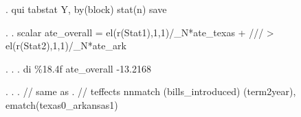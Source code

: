 . qui tabstat Y, by(block) stat(n) save   

. 
. scalar ate_overall = el(r(Stat1),1,1)/_N*ate_texas + /// 
>                                          el(r(Stat2),1,1)/_N*ate_ark

. 
. 
. di \%18.4f ate_overall
          -13.2168

. 
. 
. // same as
. // teffects nnmatch (bills_introduced) (term2year), ematch(texas0_arkansas1)
